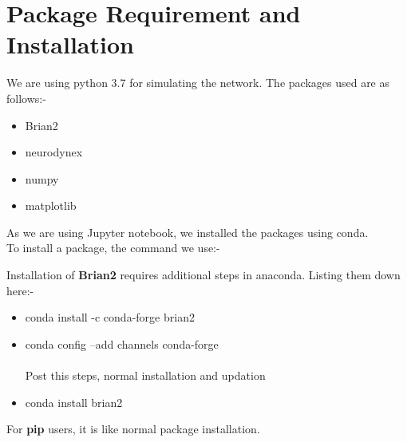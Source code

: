 \section*{Package Requirement and Installation}

We are using python 3.7 for simulating the network. The packages used are as follows:-\\

\begin{itemize}
\item Brian2
\item neurodynex
\item numpy
\item matplotlib
\end{itemize}

\noindent As we are using Jupyter notebook, we installed the packages using conda. \\

\noindent To install a package, the command we use:-\\



\newpage\noindent Installation of \textbf{Brian2} requires additional steps in anaconda. Listing them down here:-\\

\begin{itemize}
\item conda install -c conda-forge brian2
\item conda config --add channels conda-forge \\ \\
Post this steps, normal installation and updation
\item conda install brian2 
\end{itemize}

\noindent For \textbf{pip} users, it is like normal package installation.






